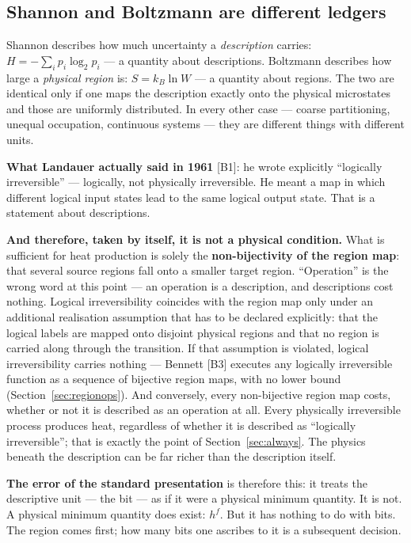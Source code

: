 \subsection{Shannon and Boltzmann are different ledgers}

\LB [B18][B19] Shannon describes how much uncertainty a \emph{description}
carries: $H = -\sum_i p_i \log_2 p_i$ --- a quantity about descriptions. Boltzmann
describes how large a \emph{physical region} is: $S = k_B \ln W$ --- a quantity
about regions. The two are identical only if one maps the description exactly onto
the physical microstates and those are uniformly distributed. In every other case
--- coarse partitioning, unequal occupation, continuous systems --- they are
different things with different units.

\LK \textbf{What Landauer actually said in 1961} [B1]: he wrote explicitly
“logically irreversible” --- logically, not physically irreversible. He meant a
map in which different logical input states lead to the same logical output state.
That is a statement about descriptions.

\LB \textbf{And therefore, taken by itself, it is not a physical condition.} What
is sufficient for heat production is solely the \textbf{non-bijectivity of the
region map}: that several source regions fall onto a smaller target region.
“Operation” is the wrong word at this point --- an operation is a description, and
descriptions cost nothing. Logical irreversibility coincides with the region map
only under an additional realisation assumption that has to be declared
explicitly: that the logical labels are mapped onto disjoint physical regions and
that no region is carried along through the transition. If that assumption is
violated, logical irreversibility carries nothing --- Bennett [B3] executes any
logically irreversible function as a sequence of bijective region maps, with no
lower bound (Section~\ref{sec:regionops}). And conversely, every non-bijective
region map costs, whether or not it is described as an operation at all. Every
physically irreversible process produces heat, regardless of whether it is
described as “logically irreversible”; that is exactly the point of
Section~\ref{sec:always}. The physics beneath the description can be far richer
than the description itself.

\LB \textbf{The error of the standard presentation} is therefore this: it treats
the descriptive unit --- the bit --- as if it were a physical minimum quantity. It
is not. A physical minimum quantity does exist: $h^f$. But it has nothing to do
with bits. The region comes first; how many bits one ascribes to it is a
subsequent decision.


